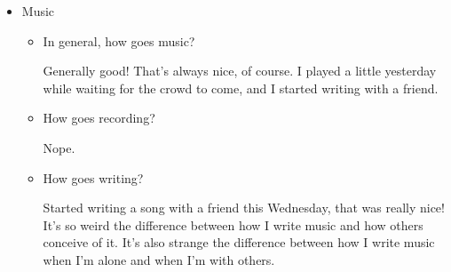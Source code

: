 \documentclass[12pt]{article}
\renewcommand{\,}{\textsuperscript{,}}
\begin{document}
\begin{itemize}
\begin{itemize}
\begin{itemize}
Nothing for a while.

\item How go(es) the web serial(s)? What's the biggest barrier to you publishing the next chapter? If it's writing, what's the barrier to writing it?

OPe. Need to remember you as well.

\item How goes the hand-written stuff?

Generally good! I got some thoughts on the page which is nice, I took some time to write my thoughts which is healthy, and that's great.

\item How's the push pin board treating you?

It fell down :(. After that, I used it yesterday for something that people could leave notes on. That was nice.

I do want it to be hanging again, though.  
Also, I'd like to have the things that I want to be doing more (e.g. poetry, web serial(s)) up there as reminders. Hard to say which of the uses (friends or me) is a better use.

\item Upon reflection, how's the written word? Anything missing in the seven questions?

Generally decent! I don't think that there's too too much missing.  
I guess that in the context of the blog, I did spend about an hour or an hour and a half this morning on remaking the template so that it would be easier for me to continue working through.

\end{itemize}  
 \item Music  
 \begin{itemize}  
 \item In general, how goes music?

Generally good! That's always nice, of course. I played a little yesterday while waiting for the crowd to come, and I started writing with a friend.

\item How goes recording?

Nope.

\item How goes writing?

Started writing a song with a friend this Wednesday, that was really nice!  
It's so weird the difference between how I write music and how others conceive of it.  
It's also strange the difference between how I write music when I'm alone and when I'm with others.


\end{itemize}
\end{itemize}
\end{itemize}
\end{document}
